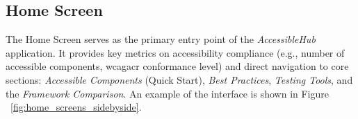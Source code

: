 \subsection{Home Screen}

The Home Screen serves as the primary entry point of the \textit{AccessibleHub} application. It provides key metrics on accessibility compliance (e.g., number of accessible components, \acrshort{wcagacr} conformance level) and direct navigation to core sections: \textit{Accessible Components} (Quick Start), \textit{Best Practices}, \textit{Testing Tools}, and the \textit{Framework Comparison}. An example of the interface is shown in Figure ~\ref{fig:home_screens_sidebyside}.

\begin{figure}[ht]
    \centering
    \begin{subfigure}[b]{0.48\textwidth}
        \centering

\end{subfigure}
\end{figure}

